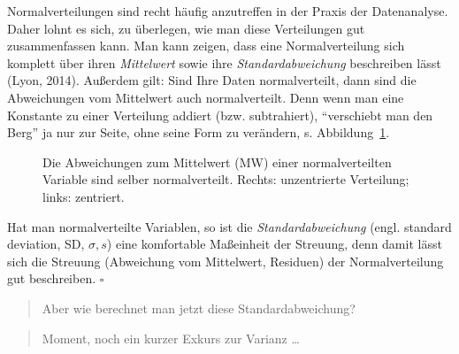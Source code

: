 \documentclass[
  letterpaper,
  oneside,
  open=any]{scrbook}
\theoremstyle{definition}
\theoremstyle{definition}
\theoremstyle{definition}
\theoremstyle{remark}
\begin{document}
Normalverteilungen sind recht häufig anzutreffen in der Praxis der
Datenanalyse. Daher lohnt es sich, zu überlegen, wie man diese
Verteilungen gut zusammenfassen kann. Man kann zeigen, dass eine
Normalverteilung sich komplett über ihren \emph{Mittelwert} sowie ihre
\emph{Standardabweichung} beschreiben lässt (Lyon, 2014). Außerdem gilt:
Sind Ihre Daten normalverteilt, dann sind die Abweichungen vom
Mittelwert auch normalverteilt. Denn wenn man eine Konstante zu einer
Verteilung addiert (bzw. subtrahiert), \enquote{verschiebt man den Berg}
ja nur zur Seite, ohne seine Form zu verändern, s.
Abbildung~\ref{fig-norm-dev}.

\begin{figure}


\caption{\label{fig-norm-dev}Die Abweichungen zum Mittelwert (MW) einer
normalverteilten Variable sind selber normalverteilt. Rechts:
unzentrierte Verteilung; links: zentriert.}

\end{figure}%

Hat man normalverteilte Variablen, so ist die \emph{Standardabweichung}
(engl. standard deviation, SD, \(\sigma, s\)) eine komfortable
Maßeinheit der Streuung, denn damit lässt sich die Streuung (Abweichung
vom Mittelwert, Residuen) der Normalverteilung gut beschreiben.
\(\square\)

\begin{quote}
{} Aber wie berechnet man jetzt diese Standardabweichung?
\end{quote}

\begin{quote}
{} Moment, noch ein kurzer Exkurs zur Varianz \ldots{}
\end{quote}
\end{document}
